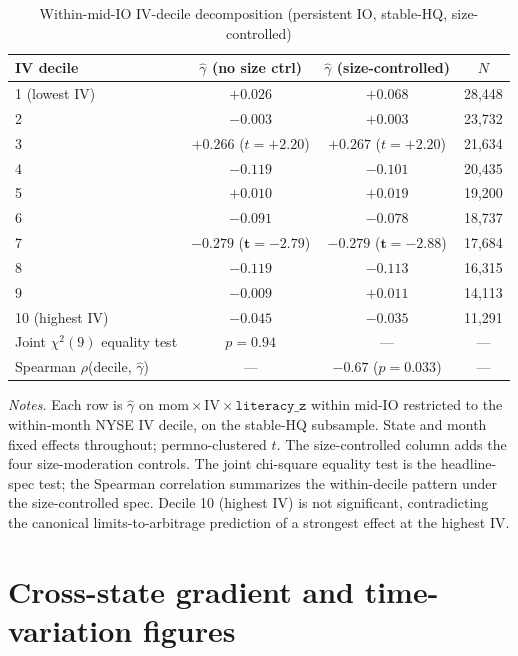 \documentclass[12pt]{article}
\begin{document}
\begin{table}[h]
\centering
\caption{Within-mid-IO IV-decile decomposition (persistent IO, stable-HQ, size-controlled)}
\label{tab:iv_within_mid_io}
\footnotesize
\begin{tabular}{lccc}
\toprule
IV decile & $\hat\gamma$ (no size ctrl) & $\hat\gamma$ (size-controlled) & $N$ \\
\midrule
1 (lowest IV) & $+0.026$ & $+0.068$ & 28,448 \\
2             & $-0.003$ & $+0.003$ & 23,732 \\
3             & $+0.266$ ($t=+2.20$) & $+0.267$ ($t=+2.20$) & 21,634 \\
4             & $-0.119$ & $-0.101$ & 20,435 \\
5             & $+0.010$ & $+0.019$ & 19,200 \\
6             & $-0.091$ & $-0.078$ & 18,737 \\
7             & $\mathbf{-0.279}$ ($\mathbf{t=-2.79}$) & $\mathbf{-0.279}$ ($\mathbf{t=-2.88}$) & 17,684 \\
8             & $-0.119$ & $-0.113$ & 16,315 \\
9             & $-0.009$ & $+0.011$ & 14,113 \\
10 (highest IV) & $-0.045$ & $-0.035$ & 11,291 \\
\midrule
Joint $\chi^{2}(9)$ equality test & $p = 0.94$ & --- & --- \\
Spearman $\rho$(decile, $\hat\gamma$) & --- & $-0.67$ ($p = 0.033$) & --- \\
\bottomrule
\end{tabular}

\medskip
{\footnotesize\textit{Notes.} Each row is $\hat\gamma$ on $\mathrm{mom}\times\mathrm{IV}\times\mathtt{literacy\_z}$ within mid-IO restricted to the within-month NYSE IV decile, on the stable-HQ subsample. State and month fixed effects throughout; permno-clustered $t$. The size-controlled column adds the four size-moderation controls. The joint chi-square equality test is the headline-spec test; the Spearman correlation summarizes the within-decile pattern under the size-controlled spec. Decile 10 (highest IV) is not significant, contradicting the canonical limits-to-arbitrage prediction of a strongest effect at the highest IV.}
\end{table}

\section{Cross-state gradient and time-variation figures}
\label{ia:gradfigs}
\end{document}
